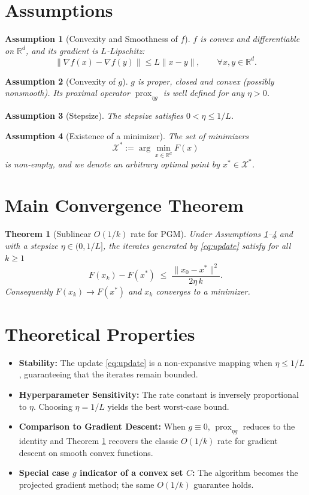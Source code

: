 \documentclass{article}
\newtheorem{theorem}{Theorem}
\newtheorem{assumption}{Assumption}
\newcommand{\prox}{\operatorname{prox}}
\newcommand{\R}{\mathbb{R}}
\begin{document}
\newpage

\section*{Assumptions}
\begin{assumption}[Convexity and Smoothness of $f$]
\label{ass:f}
$f$ is convex and differentiable on $\R^{d}$, and its gradient is $L$‑Lipschitz:
\[
\|\nabla f(x)-\nabla f(y)\|\le L\|x-y\|,\qquad\forall x,y\in\R^{d}.
\]
\end{assumption}
\begin{assumption}[Convexity of $g$]
\label{ass:g}
$g$ is proper, closed and convex (possibly nonsmooth). Its proximal operator $\prox_{\eta g}$ is well defined for any $\eta>0$.
\end{assumption}
\begin{assumption}[Stepsize]
\label{ass:step}
The stepsize satisfies $0<\eta\le 1/L$.
\end{assumption}
\begin{assumption}[Existence of a minimizer]
\label{ass:opt}
The set of minimizers
\[
\mathcal{X}^{*}:=\arg\min_{x\in\R^{d}}F(x)
\]
is non‑empty, and we denote an arbitrary optimal point by $x^{*}\in\mathcal{X}^{*}$.
\end{assumption}

\section*{Main Convergence Theorem}
\begin{theorem}[Sublinear $O(1/k)$ rate for PGM]\label{thm:rate}
Under Assumptions \ref{ass:f}–\ref{ass:opt} and with a stepsize $\eta\in(0,1/L]$, the iterates generated by \eqref{eq:update} satisfy for all $k\ge1$
\[
F(x_{k})-F(x^{*})\;\le\;\frac{\|x_{0}-x^{*}\|^{2}}{2\eta\,k}.
\]
Consequently $F(x_{k})\to F(x^{*})$ and $x_{k}$ converges to a minimizer.
\end{theorem}

\section*{Theoretical Properties}
\begin{itemize}
\item \textbf{Stability:} The update \eqref{eq:update} is a non‑expansive mapping when $\eta\le1/L$, guaranteeing that the iterates remain bounded.
\item \textbf{Hyperparameter Sensitivity:} The rate constant is inversely proportional to $\eta$. Choosing $\eta=1/L$ yields the best worst‑case bound.
\item \textbf{Comparison to Gradient Descent:} When $g\equiv0$, $\prox_{\eta g}$ reduces to the identity and Theorem \ref{thm:rate} recovers the classic $O(1/k)$ rate for gradient descent on smooth convex functions.
\item \textbf{Special case $g$ indicator of a convex set $C$:} The algorithm becomes the projected gradient method; the same $O(1/k)$ guarantee holds.
\end{itemize}
\end{document}
